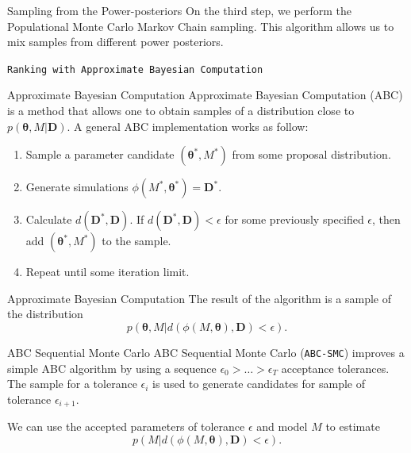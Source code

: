 \documentclass{beamer}
\begin{document}
\begin{frame}{Sampling from the Power-posteriors}
On the third step, we perform the \alert{Populational Monte Carlo Markov
Chain} sampling. This algorithm allows us to mix samples from different 
power posteriors.
\end{frame}


\begin{frame}{}
\begin{center}
    \texttt{Ranking with Approximate Bayesian Computation}
\end{center}
\end{frame}


\begin{frame}{Approximate Bayesian Computation}
Approximate Bayesian Computation (ABC) is a method that allows one to
obtain samples of a distribution close to $p ({\bm \theta}, M | {\bm
D})$. \pause
A general ABC implementation works as follow:

\begin{enumerate}
    \pause
\item{Sample a parameter candidate $({\bm \theta}^*, M^*)$ from some 
        proposal distribution.}
    \pause
\item{Generate simulations $\phi (M^*, {\bm \theta}^*) = {\bm D}^*$.}
    \pause
\item{Calculate $d ({\bm D}^*, {\bm D}).$ If $d ({\bm D}^*, {\bm D}) <
    \epsilon$ for some 
        previously specified $\epsilon$, then add $({\bm \theta}^*,
        M^*)$ to the sample.}
    \pause
    \item{Repeat until some iteration limit.}
\end{enumerate}
\end{frame}


\begin{frame}{Approximate Bayesian Computation}
The result of the algorithm is a sample of the distribution 
\begin{equation*}
p ({\bm \theta}, M| d (\phi (M, {\bm \theta}), {\bm D}) < \epsilon).
\end{equation*}

\end{frame}

\begin{frame}{ABC Sequential Monte Carlo}
\alert{ABC Sequential Monte Carlo (\texttt{ABC-SMC})} improves a simple
ABC algorithm by using a sequence $\epsilon_0 > \ldots > \epsilon_T$
    acceptance tolerances. 
\pause The sample for a tolerance $\epsilon_i$ is used to generate 
candidates for sample of tolerance $\epsilon_{i + 1}$.

\pause
We can use the accepted parameters of tolerance $\epsilon$ and model $M$
to estimate 
\begin{equation*}
    p (M | d (\phi (M, {\bm \theta}), {\bm D}) < \epsilon).
\end{equation*}
\end{frame}
\end{document}
